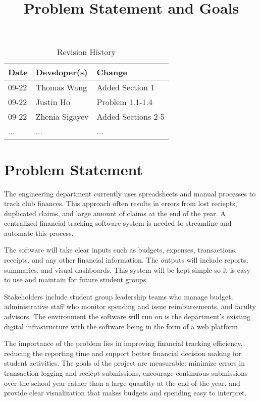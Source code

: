 \documentclass{article}
\title{Problem Statement and Goals\\\progname}
\author{\authname}
\date{}
\begin{document}
\maketitle

\begin{table}[hp]
\caption{Revision History} \label{TblRevisionHistory}
\begin{tabularx}{\textwidth}{llX}
\toprule
\textbf{Date} & \textbf{Developer(s)} & \textbf{Change}\\
\midrule
09-22 & Thomas Wang & Added Section 1\\
09-22 & Justin Ho& Problem 1.1-1.4\\
09-22 & Zhenia Sigayev & Added Sections 2-5\\
... & ... & ...\\
\bottomrule
\end{tabularx}
\end{table}

\section{Problem Statement}

The engineering department currently uses spreadsheets and manual processes to track club finances. This approach
often results in errors from lost reciepts, duplicated claims, and large amount of claims at the end of the year. A centralized
financial tracking software system is needed to streamline and automate this process.

The software will take clear inputs such as budgets, expenses, transactions, receipts, and any other financial
information. The outputs will include reports, summaries, and visual dashboards. This system will be kept simple
so it is easy to use and maintain for future student groups.

Stakeholders include student group leadership teams who manage budget, administrative staff who monitor spending and 
issue reimbursements, and faculty advisors. The environment the software will run on is the department's existing digital 
infrastructure with the software being in the form of a web platform

The importance of the problem lies in improving financial tracking efficiency, reducing the reporting time
and support better financial decision making for student activities. The goals of the project are measurable: minimize
errors in transaction logging and reciept submissions, encourage continuous submissions over the school year rather than 
a large quantity at the end of the year, and provide clear visualization that makes budgets and spending easy to interpret.
\end{document}
